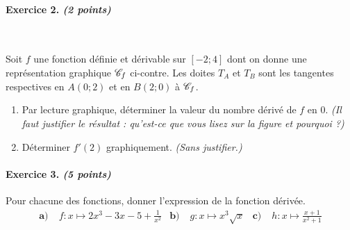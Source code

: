 \documentclass[11pt]{article}
\begin{document}
\paragraph{Exercice 2. \emph{(2 points)}}~\\
\begin{minipage}{.5\textwidth}
  Soit $f$ une fonction définie et dérivable sur $[-2;4]$ dont on donne une
  représentation graphique $\mathscr C_f$ ci-contre. Les doites $T_A$ et $T_B$ sont les
  tangentes respectives en $A(0; 2)$ et en $B(2;0)$ à $\mathscr C_f$.
  \begin{enumerate}
    \item Par lecture graphique, déterminer la valeur du nombre dérivé de $f$ en
      $0$. \emph{(Il faut justifier le résultat : qu'est-ce que vous lisez sur
      la figure et pourquoi ?)}
    \item Déterminer $f'(2)$ graphiquement. \emph{(Sans justifier.)}
  \end{enumerate}
\end{minipage}
\begin{minipage}{.5\textwidth}
\begin{center}
\end{center}
\end{minipage}

\paragraph{Exercice 3. \emph{(5 points)}}
Pour chacune des fonctions, donner l'expression de la fonction
dérivée.
\begin{align*}
  \textbf{a)}\; & f:x\mapsto 2x^3-3x-5+\frac{1}{x^2} &
  \textbf{b)}\; & g:x\mapsto x^3\sqrt x &
  \textbf{c)}\; & h:x\mapsto \frac{x+1}{x^2+1} 
\end{align*}
\end{document}

